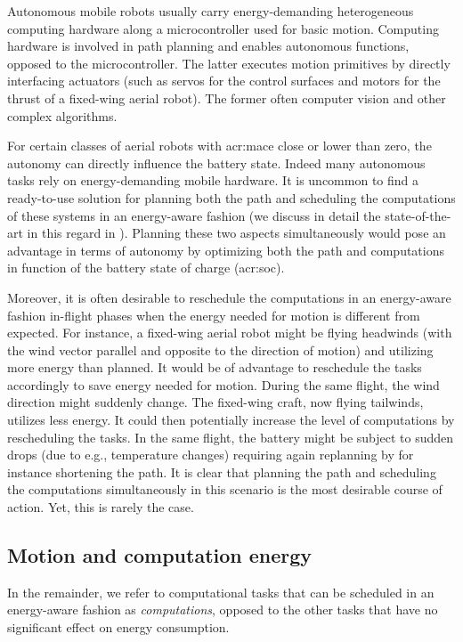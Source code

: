 Autonomous mobile robots usually carry energy-demanding heterogeneous computing hardware along a microcontroller used for basic motion. Computing hardware is involved in path planning and enables autonomous functions, opposed to the microcontroller. The latter executes motion primitives by directly interfacing actuators (such as servos for the control surfaces and motors for the thrust of a fixed-wing aerial robot). The former often computer vision and other complex algorithms.

For certain classes of aerial robots with \Gls{acr:mace} close or lower than zero, the autonomy can directly influence the battery state. Indeed many autonomous tasks rely on energy-demanding mobile hardware. It is uncommon to find a ready-to-use solution for planning both the path and scheduling the computations of these systems in an energy-aware fashion (we discuss in detail the state-of-the-art in this regard in ). Planning these two aspects simultaneously would pose an advantage in terms of autonomy by optimizing both the path and computations in function of the battery state of charge (\Gls{acr:soc}). 

Moreover, it is often desirable to reschedule the computations in an energy-aware fashion in-flight phases when the energy needed for motion is different from expected. For instance, a fixed-wing aerial robot might be flying headwinds (with the wind vector parallel and opposite to the direction of motion) and utilizing more energy than planned. It would be of advantage to reschedule the tasks accordingly to save energy needed for motion. During the same flight, the wind direction might suddenly change. The fixed-wing craft, now flying tailwinds, utilizes less energy. It could then potentially increase the level of computations by rescheduling the tasks. In the same flight, the battery might be subject to sudden drops (due to e.g., temperature changes) requiring again replanning by for instance shortening the path. It is clear that planning the path and scheduling the computations simultaneously in this scenario is the most desirable course of action. Yet, this is rarely the case.

\subsection{Motion and computation energy}

In the remainder, we refer to computational tasks that can be scheduled in an energy-aware fashion as \emph{computations}, opposed to the other tasks that have no significant effect on energy consumption. 

